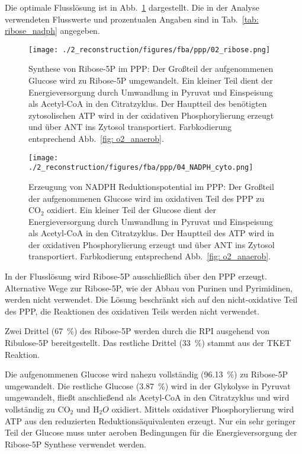 Die optimale Flusslösung ist in Abb.~\ref{fig: 02_ribose_needed} dargestellt. Die in der Analyse verwendeten Flusswerte und prozentualen Angaben sind in Tab.~\ref{tab: ribose_nadph} angegeben.

\begin{figure}[!htp]
 \centering
 \texttt{[image: ./2\_reconstruction/figures/fba/ppp/02\_ribose.png]}%
 \caption{Synthese von Ribose-5P im PPP: Der Großteil der aufgenommenen Glucose wird zu Ribose-5P umgewandelt. Ein kleiner Teil dient der Energieversorgung durch Umwandlung in Pyruvat und Einspeisung als Acetyl-CoA in den Citratzyklus. Der Hauptteil des benötigten zytosolischen ATP wird in der oxidativen Phosphorylierung erzeugt und über ANT ins Zytosol transportiert. Farbkodierung entsprechend Abb.~\ref{fig: o2_anaerob}.}
 \label{fig: 02_ribose_needed}
\end{figure}

\begin{figure}[!htp]
 \centering
 \texttt{[image: ./2\_reconstruction/figures/fba/ppp/04\_NADPH\_cyto.png]}%
 \caption{Erzeugung von NADPH Reduktionspotential im PPP: Der Großteil der aufgenommenen Glucose wird im oxidativen Teil des PPP zu $\text{CO}_2$ oxidiert. Ein kleiner Teil der Glucose dient der Energieversorgung durch Umwandlung in Pyruvat und Einspeisung als Acetyl-CoA in den Citratzyklus. Der Hauptteil des ATP wird in der oxidativen Phosphorylierung erzeugt und über ANT ins Zytosol transportiert. Farbkodierung entsprechend Abb.~\ref{fig: o2_anaerob}.}
 \label{fig: 04_NADPH_cyto}
\end{figure}

In der Flusslösung wird Ribose-5P ausschließlich über den PPP erzeugt. Alternative Wege zur Ribose-5P, wie der Abbau von Purinen und Pyrimidinen, werden nicht verwendet. Die Lösung beschränkt sich auf den nicht-oxidative Teil des PPP, die Reaktionen des oxidativen Teils werden nicht verwendet.

Zwei Drittel (67~\%) des Ribose-5P werden durch die RPI ausgehend von Ribulose-5P bereitgestellt. Das restliche Drittel (33~\%) stammt aus der TKET Reaktion. 

Die aufgenommenen Glucose wird nahezu vollständig  (96.13~\%) zu Ribose-5P umgewandelt. Die restliche Glucose (3.87~\%) wird in der Glykolyse in Pyruvat umgewandelt, fließt anschließend als Acetyl-CoA in den Citratzyklus und wird vollständig zu $\text{CO}_2$ und $\text{H}_2{O}$ oxidiert. Mittels oxidativer Phosphorylierung wird ATP aus den reduzierten Reduktionsäquivalenten erzeugt. Nur ein sehr geringer Teil der Glucose muss unter aeroben Bedingungen für die Energieversorgung der Ribose-5P Synthese verwendet werden.

